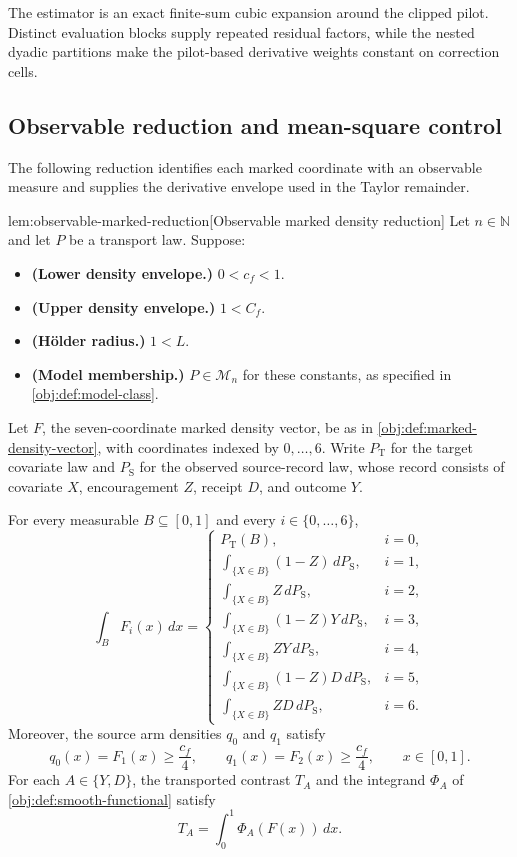 \documentclass[11pt]{article}
\begin{document}
The estimator is an exact finite-sum cubic expansion around the clipped pilot. Distinct evaluation blocks supply repeated residual factors, while the nested dyadic partitions make the pilot-based derivative weights constant on correction cells.

\subsection{Observable reduction and mean-square control}

The following reduction identifies each marked coordinate with an observable measure and supplies the derivative envelope used in the Taylor remainder.

\begin{lemmav}{lem:observable-marked-reduction}[Observable marked density reduction]
Let \(n\in\mathbb N\) and let \(P\) be a transport law. Suppose:
\begin{itemize}
\item \textbf{(Lower density envelope.)} \(0<c_f<1\).
\item \textbf{(Upper density envelope.)} \(1<C_f\).
\item \textbf{(Hölder radius.)} \(1<L\).
\item \textbf{(Model membership.)} \(P\in\mathcal M_n\) for these constants, as specified in \cref{obj:def:model-class}.
\end{itemize}
Let \(F\), the seven-coordinate marked density vector, be as in \cref{obj:def:marked-density-vector}, with coordinates indexed by \(0,\ldots,6\). Write \(P_{\mathrm T}\) for the target covariate law and \(P_{\mathrm S}\) for the observed source-record law, whose record consists of covariate \(X\), encouragement \(Z\), receipt \(D\), and outcome \(Y\).

For every measurable \(B\subseteq[0,1]\) and every \(i\in\{0,\ldots,6\}\),
\[
\int_B F_i(x)\,dx
=
\begin{cases}
P_{\mathrm T}(B), & i=0,\\
\displaystyle\int_{\{X\in B\}}(1-Z)\,dP_{\mathrm S}, & i=1,\\
\displaystyle\int_{\{X\in B\}}Z\,dP_{\mathrm S}, & i=2,\\
\displaystyle\int_{\{X\in B\}}(1-Z)Y\,dP_{\mathrm S}, & i=3,\\
\displaystyle\int_{\{X\in B\}}ZY\,dP_{\mathrm S}, & i=4,\\
\displaystyle\int_{\{X\in B\}}(1-Z)D\,dP_{\mathrm S}, & i=5,\\
\displaystyle\int_{\{X\in B\}}ZD\,dP_{\mathrm S}, & i=6.
\end{cases}
\]
Moreover, the source arm densities \(q_0\) and \(q_1\) satisfy
\[
q_0(x)=F_1(x)\ge \frac{c_f}{4},
\qquad
q_1(x)=F_2(x)\ge \frac{c_f}{4},
\qquad x\in[0,1].
\]
For each \(A\in\{Y,D\}\), the transported contrast \(T_A\) and the integrand \(\Phi_A\) of \cref{obj:def:smooth-functional} satisfy
\[
T_A=\int_0^1\Phi_A(F(x))\,dx.
\]


\end{lemmav}
\end{document}
